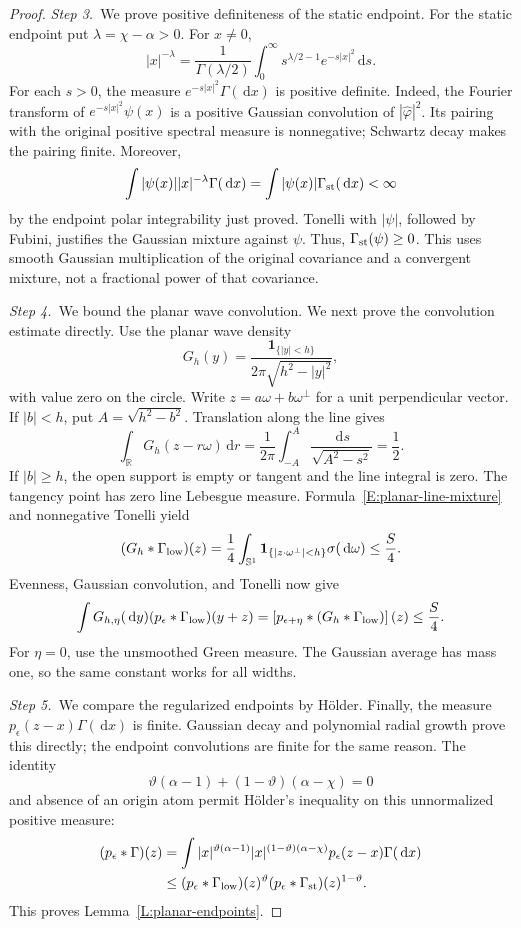 \documentclass[12pt,oneside,openany]{book}
\numberwithin{equation}{section}
\theoremstyle{nogostyle}
\theoremstyle{definition}
\newcommand{\R}{\mathbb{R}}
\newcommand{\ud}{\,\mathrm{d}}
\begin{document}
\begin{proof}
  \medskip
  \noindent\textit{Step 3.~}We prove positive definiteness of the static
  endpoint.
  For the static endpoint put $\lambda = \chi-\alpha > 0$. For $x \ne 0$,
  \[
    |x|^{-\lambda}=\frac1{\Gamma(\lambda/2)}
    \int_0^\infty s^{\lambda/2-1}e^{-s|x|^2}\ud s.
  \]
  For each $s > 0$, the measure $e^{-s|x|^2}\Gamma(\ud x)$ is positive definite.
  Indeed, the Fourier transform of $e^{-s|x|^2}\psi(x)$ is a positive Gaussian
  convolution of $|\widehat{\varphi}|^2$. Its pairing with the original positive
  spectral measure is nonnegative; Schwartz decay makes the pairing finite.
  Moreover,
  \[
    \int |\psi(x)||x|^{-\lambda}\Gamma(\ud x)
    =\int |\psi(x)|\Gamma_{\rm st}(\ud x)<\infty
  \]
  by the endpoint polar integrability just proved. Tonelli with $|\psi|$,
  followed by Fubini, justifies the Gaussian mixture against $\psi$. Thus,
  $\Gamma_{\rm st}(\psi) \ge 0$. This uses smooth Gaussian multiplication of the
  original covariance and a convergent mixture, not a fractional power of that
  covariance.


  \medskip
  \noindent\textit{Step 4.~}We bound the planar wave convolution.
  We next prove the convolution estimate directly. Use the planar wave density
  \[
    G_h(y)=\frac{\mathbf1_{\{|y|<h\}}}{2\pi\sqrt{h^2-|y|^2}},
  \]
  with value zero on the circle. Write $z = a\omega+b\omega^\perp$ for a unit
  perpendicular vector. If $|b| < h$, put $A = \sqrt{h^2-b^2}$. Translation
  along the line gives
  \[
    \int_\R G_h(z-r\omega)\ud r
    =\frac1{2\pi}\int_{-A}^A\frac{\ud s}{\sqrt{A^2-s^2}}
    =\frac12.
  \]
  If $|b| \ge h$, the open support is empty or tangent and the line integral is
  zero. The tangency point has zero line Lebesgue measure.
  Formula~\eqref{E:planar-line-mixture} and nonnegative Tonelli yield
  \[
    (G_h*\Gamma_{\rm low})(z)
    =\frac14\int_{\mathbb{S}^1}
    \mathbf1_{\{|z\cdot\omega^\perp|<h\}}\sigma(\ud\omega)
    \le\frac S4.
  \]
  Evenness, Gaussian convolution, and Tonelli now give
  \[
    \int G_{h,\eta}(\ud y)(p_\epsilon*\Gamma_{\rm low})(y+z)
    =\left[p_{\epsilon+\eta}*(G_h*\Gamma_{\rm low})\right](z)
    \le\frac S4.
  \]
  For $\eta = 0$, use the unsmoothed Green measure. The Gaussian average has
  mass one, so the same constant works for all widths.


  \medskip
  \noindent\textit{Step 5.~}We compare the regularized endpoints by Hölder.
  Finally, the measure $p_\epsilon(z-x)\Gamma(\ud x)$ is finite. Gaussian decay
  and polynomial radial growth prove this directly; the endpoint convolutions
  are finite for the same reason. The identity
  \[
    \vartheta(\alpha-1)+(1-\vartheta)(\alpha-\chi)=0
  \]
  and absence of an origin atom permit H\"older's inequality on this
  unnormalized positive measure:
  \[
    \begin{split}
      (p_\epsilon*\Gamma)(z)
      &=\int |x|^{\vartheta(\alpha-1)}
      |x|^{(1-\vartheta)(\alpha-\chi)}
      p_\epsilon(z-x)\Gamma(\ud x)\\
      &\le(p_\epsilon*\Gamma_{\rm low})(z)^\vartheta
      (p_\epsilon*\Gamma_{\rm st})(z)^{1-\vartheta}.
    \end{split}
  \]
  This proves Lemma~\ref{L:planar-endpoints}.
\end{proof}
\end{document}
